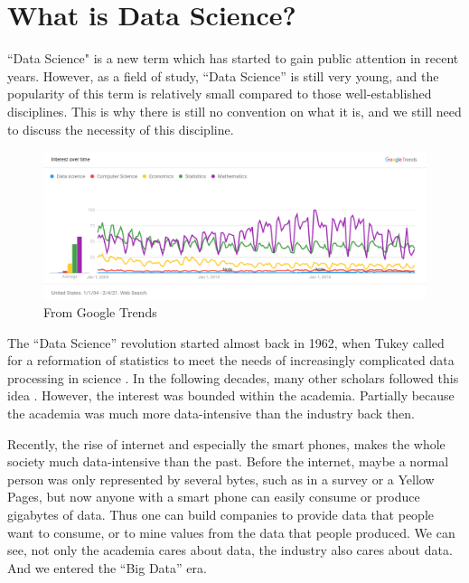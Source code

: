 \newcommand\chapternumber{1}

\usepackage{enumerate}
\usepackage{float}



\section*{What is Data Science?}

``Data Science" is a new term which has started to gain public attention in recent years.
However, as a field of study, ``Data Science'' is still very young, and
the popularity of this term is relatively small compared to those well-established disciplines.
This is why there is still no convention on what it is, and we still need to discuss the necessity of this discipline.

\begin{figure}[h]
    \includegraphics[width=\textwidth]{images/google_trends.png}
    \caption{From Google Trends \cite{Google_Trends}}
\end{figure}

The ``Data Science'' revolution started almost back in 1962, when Tukey called for a reformation of statistics to meet the needs of increasingly complicated data processing in science \cite{tukey_future_1962}.
In the following decades, many other scholars followed this idea \cite{donoho_50_2017}.
However, the interest was bounded within the academia.
Partially because the academia was much more data-intensive than the industry back then.

Recently, the rise of internet and especially the smart phones, makes the whole society much data-intensive than the past.
Before the internet, maybe a normal person was only represented by several bytes, such as in a survey or a Yellow Pages, but now anyone with a smart phone can easily consume or produce gigabytes of data.
Thus one can build companies to provide data that people want to consume, or to mine values from the data that people produced.
We can see, not only the academia cares about data, the industry also cares about data.
And we entered the ``Big Data'' era.


